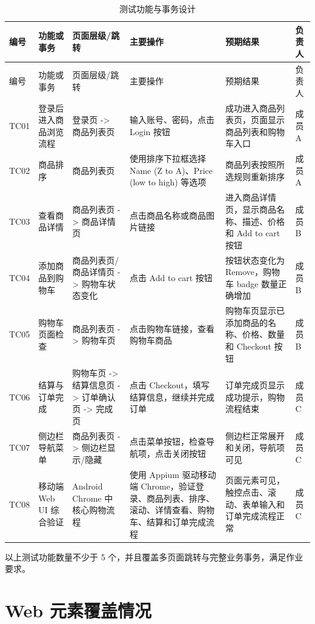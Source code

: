 \documentclass[UTF8,a4paper,12pt]{ctexart}
\begin{document}
\begingroup
\scriptsize
\setlength{\tabcolsep}{2pt}
\begin{longtable}{p{1.1cm}p{2.2cm}p{2.7cm}p{2.7cm}p{3.8cm}p{1.2cm}}
\caption{测试功能与事务设计}\\
\toprule
编号 & 功能或事务 & 页面层级/跳转 & 主要操作 & 预期结果 & 负责人 \\
\midrule
\endfirsthead
\toprule
编号 & 功能或事务 & 页面层级/跳转 & 主要操作 & 预期结果 & 负责人 \\
\midrule
\endhead
TC01 & 登录后进入商品浏览流程 & 登录页 -> 商品列表页 & 输入账号、密码，点击 Login 按钮 & 成功进入商品列表页，页面显示商品列表和购物车入口 & 成员 A \\
TC02 & 商品排序 & 商品列表页 & 使用排序下拉框选择 Name (Z to A)、Price (low to high) 等选项 & 商品列表按照所选规则重新排序 & 成员 A \\
TC03 & 查看商品详情 & 商品列表页 -> 商品详情页 & 点击商品名称或商品图片链接 & 进入商品详情页，显示商品名称、描述、价格和 Add to cart 按钮 & 成员 B \\
TC04 & 添加商品到购物车 & 商品列表页/商品详情页 -> 购物车状态变化 & 点击 Add to cart 按钮 & 按钮状态变化为 Remove，购物车 badge 数量正确增加 & 成员 B \\
TC05 & 购物车页面检查 & 商品列表页 -> 购物车页 & 点击购物车链接，查看购物车商品 & 购物车页显示已添加商品的名称、价格、数量和 Checkout 按钮 & 成员 B \\
TC06 & 结算与订单完成 & 购物车页 -> 结算信息页 -> 订单确认页 -> 完成页 & 点击 Checkout，填写结算信息，继续并完成订单 & 订单完成页显示成功提示，购物流程结束 & 成员 C \\
TC07 & 侧边栏导航菜单 & 商品列表页 -> 侧边栏显示/隐藏 & 点击菜单按钮，检查导航项，点击关闭按钮 & 侧边栏正常展开和关闭，导航项可见 & 成员 C \\
TC08 & 移动端 Web UI 综合验证 & Android Chrome 中核心购物流程 & 使用 Appium 驱动移动端 Chrome，验证登录、商品列表、排序、滚动、详情查看、购物车、结算和订单完成流程 & 页面元素可见，触控点击、滚动、表单输入和订单完成流程正常 & 成员 C \\
\bottomrule
\end{longtable}
\endgroup

以上测试功能数量不少于 5 个，并且覆盖多页面跳转与完整业务事务，满足作业要求。

\section{Web 元素覆盖情况}
\end{document}
